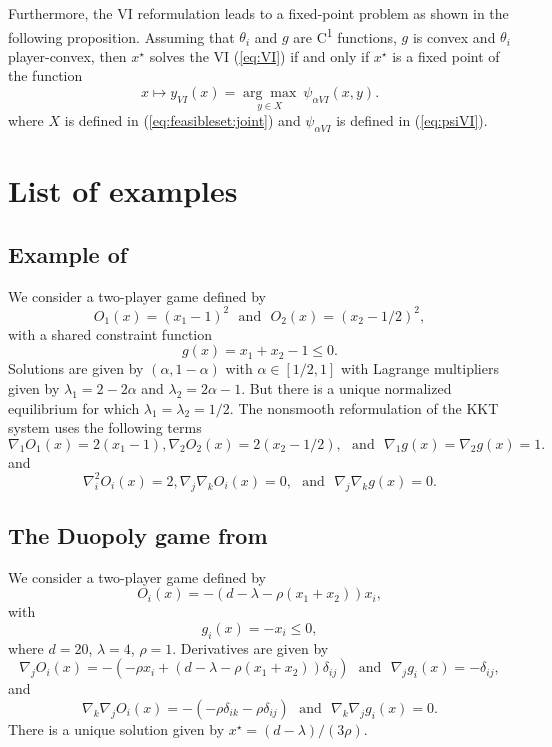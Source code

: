 \documentclass[11pt]{article}
\newcommand{\txtm}[1]{\textrm{~~#1~~}}
\newcommand{\expo}{\textsuperscript}
\begin{document}
Furthermore, the VI reformulation leads to a fixed-point problem as shown in the following proposition.
Assuming that $\theta_i$ and $g$ are C\expo{1} functions, $g$ is convex and $\theta_i$ player-convex, then $x^\star$ solves the VI (\ref{eq:VI}) if and only if $x^\star$ is a fixed point of the function 
\begin{equation}
x \mapsto y_{VI}(x) = \underset{y\in X}{\arg\max}~ \psi_{\alpha VI}(x, y).
\label{eq:fpVIa:joint}
\end{equation}
where $X$ is defined in (\ref{eq:feasibleset:joint}) and $\psi_{\alpha VI}$ is defined in (\ref{eq:psiVI}).







\section{List of examples}

\subsection{Example of \cite{facchineietal07}}
We consider a two-player game defined by 
$$
O_1(x) = (x_1-1)^2 
\txtm{and}
O_2(x) = (x_2-1/2)^2,  
$$
with a shared constraint function
$$
g(x) = x_1 + x_2 - 1 \leq 0.
$$
Solutions are given by $(\alpha, 1-\alpha)$ with $\alpha \in [1/2, 1]$ with Lagrange multipliers given by $\lambda_1 = 2 - 2\alpha$ and $\lambda_2 = 2\alpha - 1$.
But there is a unique normalized equilibrium for which $\lambda_1=\lambda_2=1/2$.
The nonsmooth reformulation of the KKT system uses the following terms
$$
\nabla_1 O_1(x) = 2(x_1-1),
\nabla_2 O_2(x) = 2(x_2-1/2),
\txtm{and}
\nabla_1 g(x) = \nabla_2 g(x) = 1.
$$
and 
$$
\nabla_i^2 O_i(x) = 2,
\nabla_j \nabla_k O_i(x) = 0,
\txtm{and}
\nabla_j \nabla_k g(x) = 0.
$$

\subsection{The Duopoly game from \cite{krawuryasev00}}
We consider a two-player game defined by 
$$
O_i(x) = - (d- \lambda -\rho(x_1+x_2))x_i,
$$
with 
$$
g_i(x) = -x_i \leq 0,
$$
where $d = 20$, $\lambda = 4$, $\rho = 1$.
Derivatives are given by
$$
\nabla_j O_i(x) = -( -\rho x_i + (d- \lambda -\rho(x_1+x_2))\delta_{ij} )
\txtm{and}
\nabla_j g_i(x) = - \delta_{ij},
$$
and
$$
\nabla_k \nabla_j O_i(x) = -( -\rho \delta_{ik} - \rho\delta_{ij})
\txtm{and}
\nabla_k \nabla_j g_i(x) = 0.
$$
There is a unique solution given by $x^\star = (d-\lambda)/(3\rho)$.
\end{document}
